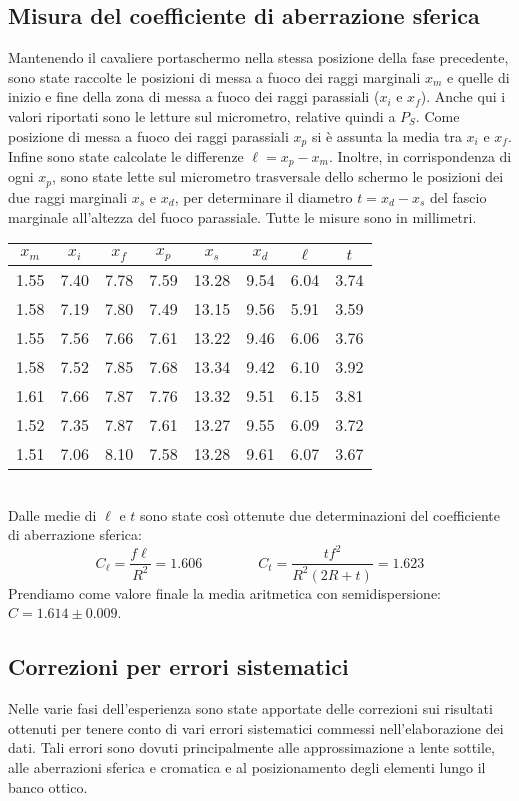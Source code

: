 \documentclass[italian,a4paper]{article}
\begin{document}
\subsection{Misura del coefficiente di aberrazione sferica}
Mantenendo il cavaliere portaschermo nella stessa posizione della fase precedente, sono state raccolte le posizioni di messa a fuoco dei raggi marginali $x_m$ e quelle di inizio e fine della zona di messa a fuoco dei raggi parassiali ($x_i$ e $x_f$). Anche qui i valori riportati sono le letture sul micrometro, relative quindi a $P_S$. Come posizione di messa a fuoco dei raggi parassiali $x_p$ si è assunta la media tra $x_i$ e $x_f$. Infine sono state calcolate le differenze $\ell=x_p-x_m$. 
Inoltre, in corrispondenza di ogni $x_p$, sono state lette sul micrometro trasversale dello schermo le posizioni dei due raggi marginali $x_s$ e $x_d$, per determinare il diametro $t=x_d-x_s$ del fascio marginale all'altezza del fuoco parassiale. Tutte le misure sono in millimetri.
\begin{table}[!h]
\centering
\begin{tabular}{*6c|cc}
$x_m$& $x_i$& $x_f$& $x_p$& $x_s$& $x_d$& $\ell$& $t$ \\\hline
1.55 &7.40 &7.78 &7.59 &13.28 &9.54 &6.04 &3.74\\
1.58 &7.19 &7.80 &7.49 &13.15 &9.56 &5.91 &3.59\\
1.55 &7.56 &7.66 &7.61 &13.22 &9.46 &6.06 &3.76\\
1.58 &7.52 &7.85 &7.68 &13.34 &9.42 &6.10 &3.92\\
1.61 &7.66 &7.87 &7.76 &13.32 &9.51 &6.15 &3.81\\
1.52 &7.35 &7.87 &7.61 &13.27 &9.55 &6.09 &3.72\\
1.51 &7.06 &8.10 &7.58 &13.28 &9.61 &6.07 &3.67\\
\end{tabular}
\end{table}\\
Dalle medie di $\ell$ e $t$ sono state così ottenute due determinazioni del coefficiente di aberrazione sferica:
$$ C_\ell=\dfrac{f\ell}{R^2}=1.606\qquad\qquad
C_t=\dfrac{tf^2}{R^2(2R+t)}=1.623$$
Prendiamo come valore finale la media aritmetica con semidispersione: $C = 1.614 \pm 0.009$.
\subsection{Correzioni per errori sistematici}
Nelle varie fasi dell'esperienza sono state apportate delle correzioni sui risultati ottenuti per tenere conto di vari errori sistematici commessi nell'elaborazione dei dati. Tali errori sono dovuti principalmente alle approssimazione a lente sottile, alle aberrazioni sferica e cromatica e al posizionamento degli elementi lungo il banco ottico.
\end{document}

